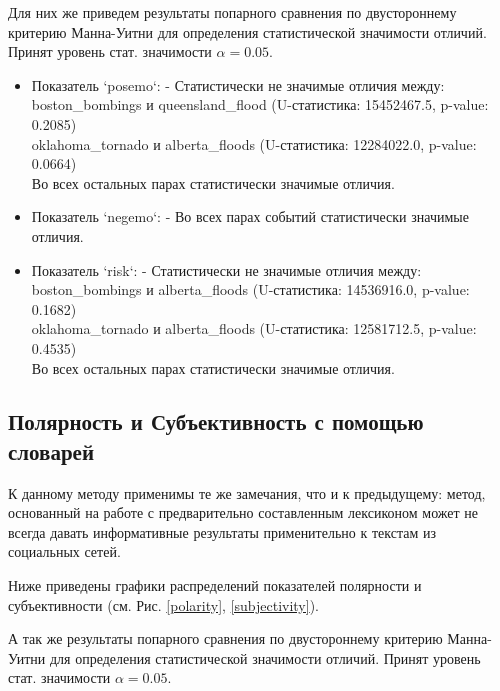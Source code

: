 \documentclass[11pt]{article}
\begin{document}
Для них же приведем результаты попарного сравнения по двустороннему критерию Манна-Уитни для определения статистической значимости отличий. Принят уровень стат. значимости $\alpha = 0.05$.
\begin{itemize}
    \item Показатель `posemo`: - Статистически не значимые отличия между:\\
    boston\_bombings и queensland\_flood (U-статистика: 15452467.5, p-value: 0.2085) \\
    oklahoma\_tornado и alberta\_floods (U-статистика: 12284022.0, p-value: 0.0664) \\
    Во всех остальных парах статистически значимые отличия.
    
    \item Показатель `negemo`: - Во всех парах событий статистически значимые отличия.
    
    \item Показатель `risk`: - Статистически не значимые отличия между:\\
    boston\_bombings и alberta\_floods (U-статистика: 14536916.0, p-value: 0.1682) \\
    oklahoma\_tornado и alberta\_floods (U-статистика: 12581712.5, p-value: 0.4535) \\
    Во всех остальных парах статистически значимые отличия.
\end{itemize}

\subsection{Полярность и Субъективность с помощью словарей}

К данному методу применимы те же замечания, что и к предыдущему: метод, основанный на работе с предварительно составленным лексиконом может не всегда давать информативные результаты применительно к текстам из социальных сетей.

Ниже приведены графики распределений показателей полярности и субъективности (см. Рис. \ref{polarity}, \ref{subjectivity}).

А так же результаты попарного сравнения по двустороннему критерию Манна-Уитни для определения статистической значимости отличий. Принят уровень стат. значимости $\alpha = 0.05$.
\end{document}

